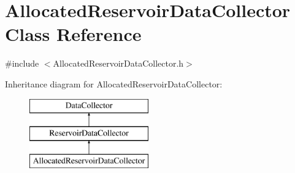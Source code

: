 \hypertarget{classAllocatedReservoirDataCollector}{}\section{Allocated\+Reservoir\+Data\+Collector Class Reference}
\label{classAllocatedReservoirDataCollector}


{\ttfamily \#include $<$Allocated\+Reservoir\+Data\+Collector.\+h$>$}

Inheritance diagram for Allocated\+Reservoir\+Data\+Collector\+:\begin{figure}[H]
\begin{center}
\leavevmode
\includegraphics[height=3.000000cm]{classAllocatedReservoirDataCollector}
\end{center}
\end{figure}

